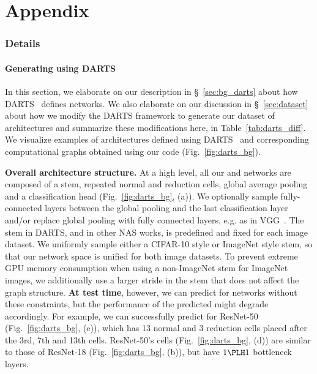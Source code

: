 \appendix
\setlength\cftbeforesubsecskip{-1pt}
\renewcommand\cftsecafterpnum{\vskip0pt}

\part{Appendix}\label{sec:apdx}

\vspace{-10pt}
\begin{spacing}{0.2}
	\parttoc \end{spacing}


\vspace{-3pt}
\section{\dataset Details \label{apdx:dataset}}
\vspace{-5pt}

\subsection{Generating \dataset using DARTS\label{apdx:darts_bg}}
\vspace{-3pt}

In this section, we elaborate on our description in \S~\ref{sec:bg_darts} about how DARTS~\cite{liu2018darts} defines networks. We also elaborate on our discussion in \S~\ref{sec:dataset} about how we modify the DARTS framework to generate our \dataset dataset of architectures and summarize these modifications here, in Table~\ref{tab:darts_diff}.
We visualize examples of architectures defined using DARTS~\cite{liu2018darts} and corresponding computational graphs obtained using our code (Fig.~\ref{fig:darts_bg}). 

\textbf{Overall architecture structure.} At a high level, all our \iid and \ood networks are composed of a stem, repeated normal and reduction cells, global average pooling and a classification head (Fig.~\ref{fig:darts_bg}, (a)). We optionally sample fully-connected layers between the global pooling and the last classification layer and/or replace global pooling with fully connected layers, e.g. as in VGG~\cite{simonyan2014very}. The stem in DARTS, and in other NAS works, is predefined and fixed for each image dataset. We uniformly sample either a CIFAR-10 style or ImageNet style stem, so that our network space is unified for both image datasets. To prevent extreme GPU memory consumption when using a non-ImageNet stem for ImageNet images, we additionally use a larger stride in the stem that does not affect the graph structure.
\textbf{At test time}, however, we can predict \params for networks without these constraints, but the performance of the predicted \params might degrade accordingly. For example, we can successfully predict \params for ResNet-50 (Fig.~\ref{fig:darts_bg}, (e)), which has 13 normal and 3 reduction cells placed after the 3rd, 7th and 13th cells. ResNet-50's cells (Fig.~\ref{fig:darts_bg}, (d)) are similar to those of ResNet-18 (Fig.~\ref{fig:darts_bg}, (b)), but have $1\PLH 1$ bottleneck layers.


